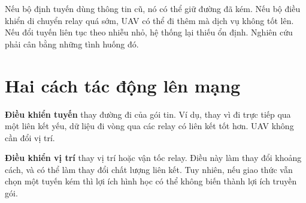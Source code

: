Nếu bộ định tuyến dùng thông tin cũ, nó có thể giữ đường đã kém. Nếu bộ điều khiển di chuyển relay quá sớm, UAV có thể đi thêm mà dịch vụ không tốt lên. Nếu đổi tuyến liên tục theo nhiễu nhỏ, hệ thống lại thiếu ổn định. Nghiên cứu phải cân bằng những tình huống đó.

\section{Hai cách tác động lên mạng}
\textbf{Điều khiển tuyến} thay đường đi của gói tin. Ví dụ, thay vì đi trực tiếp qua một liên kết yếu, dữ liệu đi vòng qua các relay có liên kết tốt hơn. UAV không cần đổi vị trí.

\textbf{Điều khiển vị trí} thay vị trí hoặc vận tốc relay. Điều này làm thay đổi khoảng cách, và có thể làm thay đổi chất lượng liên kết. Tuy nhiên, nếu giao thức vẫn chọn một tuyến kém thì lợi ích hình học có thể không biến thành lợi ích truyền gói.


